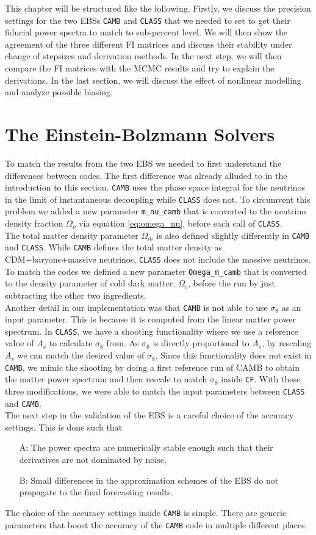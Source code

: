 \documentclass[oneside]{book}
\newcommand*{\cosmicfish}{\texttt{CF}\xspace}
\newcommand*{\class}{{\tt CLASS}\xspace}
\newcommand*{\camb}{{\tt CAMB}\xspace}
\begin{document}
This chapter will be structured like the following. Firstly, we discuss the precision settings for the two EBSs \camb and \class that we needed to set to get their fiducial power spectra to match to sub-percent level. We will then show the agreement of the three different FI matrices and discuss their stability under change of stepsizes and derivation methods. In the next step, we will then compare the FI matrices with the MCMC results and try to explain the derivations. In the last section, we will discuss the effect of nonlinear modelling and analyze possible biasing.
\section{The Einstein-Bolzmann Solvers}
To match the results from the two EBS we needed to first understand the differences between codes. The first difference was already alluded to in the introduction to this section. \camb uses the phase space integral for the neutrinos in the limit of instantaneous decoupling while \class does not. To circumvent this problem we added a new parameter {\tt m\_nu\_camb} that is converted to the neutrino density fraction $\Omega_\nu$ via equation \ref{eq:omega_nu}, before each call of \class .\\
The total matter density parameter $\Omega_m$ is also defined slightly differently in \camb and \class. While \camb defines the total matter density as CDM+baryons+massive neutrinos, \class does not include the massive neutrinos. To match the codes we defined a new parameter {\tt Omega\_m\_camb} that is converted to the density parameter of cold dark matter, $\Omega_{c}$, before the run by just subtracting the other two ingredients.\\
Another detail in our implementation was that \camb is not able to use $\sigma_8$ as an input parameter. This is because it is computed from the linear matter power spectrum. In \class, we have a shooting functionality where we use a reference value of $A_s$ to calculate $\sigma_8$ from. As $\sigma_8$ is directly proportional to $A_s$, by rescaling $A_s$ we can match the desired value of $\sigma_8$. Since this functionality does not exist in \camb, we mimic the shooting by doing a first reference run of CAMB to obtain the matter power spectrum and then rescale to match $\sigma_8$ inside \cosmicfish. With these three modifications, we were able to match the input parameters between \class and \camb.\\
The next step in the validation of the EBS is a careful choice of the accuracy settings. This is done such that \begin{enumerate}
    \item[A:] The power spectra are numerically stable enough such that their derivatives are not dominated by noise,
    \item[B:] Small differences in the approximation schemes of the EBS do not propagate to the final forecasting results.   
\end{enumerate} The choice of the accuracy settings inside \camb is simple. There are generic parameters that boost the accuracy of the \camb code in multiple different places.
\end{document}

